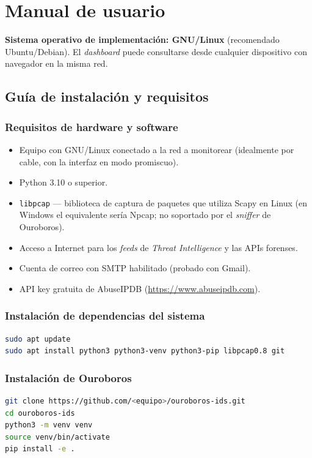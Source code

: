 \documentclass[12pt,letterpaper]{report}
\begin{document}
\chapter{Manual de usuario}

\textbf{Sistema operativo de implementación: GNU/Linux} (recomendado
Ubuntu/Debian). El \textit{dashboard} puede consultarse desde cualquier
dispositivo con navegador en la misma red.

\section{Guía de instalación y requisitos}

\subsection{Requisitos de hardware y software}
\begin{itemize}[nosep]
  \item Equipo con GNU/Linux conectado a la red a monitorear (idealmente por
        cable, con la interfaz en modo promiscuo).
  \item Python 3.10 o superior.
  \item \texttt{libpcap} --- biblioteca de captura de paquetes que utiliza
        Scapy en Linux (en Windows el equivalente sería Npcap; no soportado
        por el \textit{sniffer} de Ouroboros).
  \item Acceso a Internet para los \textit{feeds} de \textit{Threat
        Intelligence} y las APIs forenses.
  \item Cuenta de correo con SMTP habilitado (probado con Gmail).
  \item API key gratuita de AbuseIPDB (\url{https://www.abuseipdb.com}).
\end{itemize}

\subsection{Instalación de dependencias del sistema}
\begin{lstlisting}[language=bash]
sudo apt update
sudo apt install python3 python3-venv python3-pip libpcap0.8 git
\end{lstlisting}

\subsection{Instalación de Ouroboros}
\begin{lstlisting}[language=bash]
git clone https://github.com/<equipo>/ouroboros-ids.git
cd ouroboros-ids
python3 -m venv venv
source venv/bin/activate
pip install -e .
\end{lstlisting}
\end{document}
